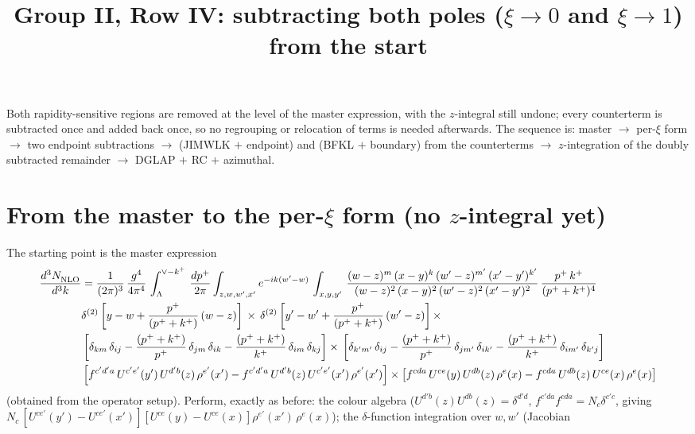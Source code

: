 \documentclass[9pt]{article}
\title{Group II, Row IV: subtracting both poles ($\xi\to0$ and $\xi\to1$) from the start}
\author{}
\date{}
\newcommand{\Wyy}{\left[U^{ce'}(y') - U^{ce'}(x')\right] \left[U^{ce}(y) - U^{ce}(x)\right] \rho^{e'}(x')\, \rho^{e}(x)}
\begin{document}
\maketitle
\vspace{-2.5em}

Both rapidity-sensitive regions are removed at the level of the master expression, with the
$z$-integral still undone; every counterterm is subtracted once and added back once, so no
regrouping or relocation of terms is needed afterwards. The sequence is: master $\to$ per-$\xi$
form $\to$ two endpoint subtractions $\to$ (JIMWLK $+$ endpoint) and (BFKL $+$ boundary) from
the counterterms $\to$ $z$-integration of the doubly subtracted remainder $\to$ DGLAP $+$ RC
$+$ azimuthal.

\section{From the master to the per-$\xi$ form (no $z$-integral yet)}
The starting point is the master expression
\begin{align} \label{eq:first}
     \frac{d^{3}N_{\rm NLO}^{\rm}}{d^{3}k}  & = \frac{1}{(2\pi)^{3}}\,\frac{g^{4}}{4\pi^{4}}\,\int_{\Lambda}^{\vee-k^{+}}\, \frac{dp^{+}}{2\pi}\int_{z,w,w^{\prime},x'} e^{-ik(w^{\prime}-w)}\,  \int_{x,y,y^{\prime}}\,\frac{(w-z)^{m}\,(x-y)^{k}\,(w'-z)^{m'}\,(x'-y')^{k'}}{(w-z)^{2}\,(x-y)^{2}\,(w'-z)^{2}\,(x'-y')^{2}}\,\frac{p^{+}\,k^{+}}{(p^{+}+k^{+})^{4}}\notag \\ & \delta^{(2)}\left[y-w+\frac{p^{+}}{(p^{+}+k^{+})}\,(w-z)\right]\,\times\, \delta^{(2)}\left[y'-w'+\frac{p^{+}}{(p^{+}+k^{+})}\,(w'-z)\right]\times\notag \\ &  \left[\delta_{km}\,\delta_{ij}-\frac{(p^{+}+k^{+})}{p^{+}}\,\delta_{jm}\,\delta_{ik}-\frac{(p^{+}+k^{+})}{k^{+}}\,\delta_{im}\,\delta_{kj}\right]\times\, \left[\delta_{k'm'}\,\delta_{ij}-\frac{(p^{+}+k^{+})}{p^{+}}\,\delta_{jm'}\,\delta_{ik'}-\frac{(p^{+}+k^{+})}{k^{+}}\,\delta_{im'}\,\delta_{k'j}\right]\notag \\ & \left[f^{c'd'a}\,U^{c'e'}(y')\,U^{d'b}(z)\,\rho^{e'}(x')-f^{c'd'a}\,
    U^{d'b}(z)\,U^{c'e'}(x')\,\rho^{e'}(x')\right]\times \left[f^{cda}\,U^{ce}(y)\,U^{db}(z)\,\rho^{e}(x)-f^{cda}\,
    U^{db}(z)\,U^{ce}(x)\,\rho^{e}(x)\right]
\end{align}
(obtained from the operator setup). Perform, exactly as before: the colour algebra
($U^{d'b}(z)U^{db}(z)=\delta^{d'd}$, $f^{c'da}f^{cda}=N_{c}\delta^{c'c}$, giving
$N_{c}\,\Wyy$); the $\delta$-function integration over $w,w'$ (Jacobian
\end{document}
